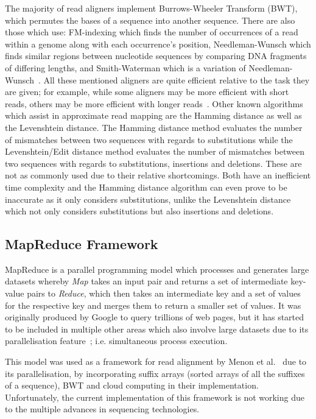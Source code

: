 \documentclass{csfyp}
\begin{document}
The majority of read aligners implement Burrows-Wheeler Transform (BWT), which permutes the bases of a sequence into another sequence.  There are also those which use: FM-indexing which finds the number of occurrences of a read within a genome along with each occurrence's position, Needleman-Wunsch which finds similar regions between nucleotide sequences by comparing DNA fragments of differing lengths, and Smith-Waterman which is a variation of Needleman-Wunsch~\cite{bwtransform, popgen, cgreads}.  All these mentioned aligners are quite efficient relative to the task they are given; for example, while some aligners may be more efficient with short reads, others may be more efficient with longer reads~\cite{companalys, compalign}.  Other known algorithms which assist in approximate read mapping are the Hamming distance as well as the Levenshtein distance.  The Hamming distance method evaluates the number of mismatches between two sequences with regards to substitutions while the Levenshtein/Edit distance method evaluates the number of mismatches between two sequences with regards to substitutions, insertions and deletions.  These are not as commonly used due to their relative shortcomings.  Both have an inefficient time complexity and the Hamming distance algorithm can even prove to be inaccurate as it only considers substitutions, unlike the Levenshtein distance which not only considers substitutions but also insertions and deletions.  

\subsection{MapReduce Framework}\vspace{-2ex}
MapReduce is a parallel programming model which processes and generates large datasets whereby {\textit{Map}} takes an input pair and returns a set of intermediate key-value pairs to {\textit{Reduce}}, which then takes an intermediate key and a set of values for the respective key and merges them to return a smaller set of values.  It was originally produced by Google to query trillions of web pages, but it has started to be included in multiple other areas which also involve large datasets due to its parallelisation feature~\cite{mapreduce}; i.e. simultaneous process execution.    

This model was used as a framework for read alignment by Menon et al.~\cite{mapredgen} due to its parallelisation, by incorporating suffix arrays (sorted arrays of all the suffixes of a sequence), BWT and cloud computing in their implementation.  Unfortunately, the current implementation of this framework is not working due to the multiple advances in sequencing technologies.              
\end{document}
